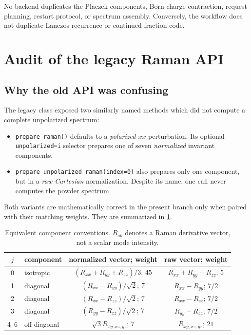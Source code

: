 \documentclass[11pt,a4paper]{article}
\begin{document}
No backend duplicates the Placzek components, Born-charge contraction,
request planning, restart protocol, or spectrum assembly.  Conversely, the
workflow does not duplicate Lanczos recurrence or continued-fraction code.

\section{Audit of the legacy Raman API}
\label{sec:legacy-audit}

\subsection{Why the old API was confusing}

The legacy class exposed two similarly named methods which did not compute a
complete unpolarized spectrum:
\begin{itemize}
  \item \texttt{prepare\_raman()} defaults to a \emph{polarized $xx$}
        perturbation.  Its optional \texttt{unpolarized=i} selector prepares
        one of seven \emph{normalized} invariant components.
  \item \texttt{prepare\_unpolarized\_raman(index=0)} also prepares only one
        component, but in a \emph{raw Cartesian} normalization.  Despite its
        name, one call never computes the powder spectrum.
\end{itemize}
Both variants are mathematically correct in the present branch only when
paired with their matching weights.  They are summarized in
\cref{tab:legacy-normalizations}.

\begin{table}[ht]
\centering
\caption{Equivalent component conventions.  $R_{ab}$ denotes a Raman
derivative vector, not a scalar mode intensity.}
\label{tab:legacy-normalizations}
\small
\begin{tabular}{@{}clcc@{}}
\toprule
$j$ & component & normalized vector; weight & raw vector; weight\\
\midrule
0 & isotropic & $(R_{xx}+R_{yy}+R_{zz})/3$; $45$
              & $R_{xx}+R_{yy}+R_{zz}$; $5$\\
1 & diagonal & $(R_{xx}-R_{yy})/\sqrt2$; $7$
              & $R_{xx}-R_{yy}$; $7/2$\\
2 & diagonal & $(R_{xx}-R_{zz})/\sqrt2$; $7$
              & $R_{xx}-R_{zz}$; $7/2$\\
3 & diagonal & $(R_{yy}-R_{zz})/\sqrt2$; $7$
              & $R_{yy}-R_{zz}$; $7/2$\\
4--6 & off-diagonal & $\sqrt3 R_{xy,xz,yz}$; $7$
              & $R_{xy,xz,yz}$; $21$\\
\bottomrule
\end{tabular}
\end{table}
\end{document}

